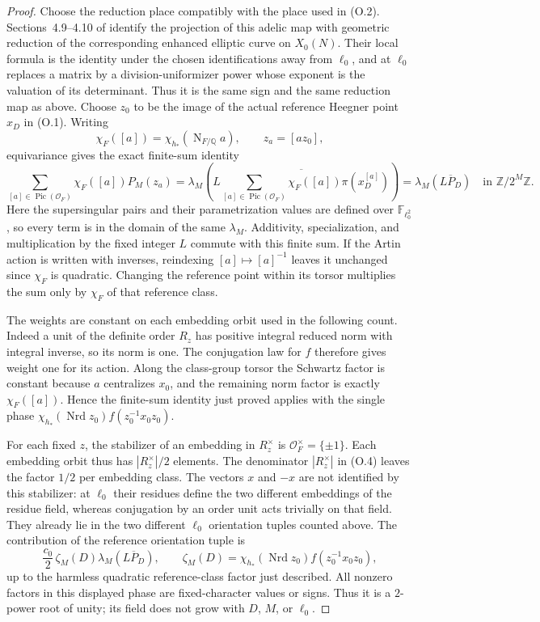 \documentclass[11pt]{article}
\theoremstyle{definition}
\theoremstyle{remark}
\newcommand{\Q}{\mathbb Q}
\newcommand{\Z}{\mathbb Z}
\begin{document}
\begin{proof}
Choose the reduction place compatibly with the place used in (O.2).
Sections~4.9--4.10 of \cite{cornutjetchev} identify the projection
of this adelic map with geometric reduction of the corresponding
enhanced elliptic curve on $X_0(N)$. Their local formula is the
identity under the chosen identifications away from $\ell_0$, and
at $\ell_0$ replaces a matrix by a division-uniformizer power
whose exponent is the valuation of its determinant. Thus it is
the same sign and the same reduction map as above. Choose $z_0$
to be the image of the actual reference Heegner point $x_D$ in
(O.1). Writing
\[
 \chi_F([a])=\chi_{h_*}(\operatorname{N}_{F/\Q}a),\qquad
 z_a=[az_0],
\]
equivariance gives the exact finite-sum identity
\[
 \sum_{[a]\in\operatorname{Pic}(\mathcal O_F)}
       \chi_F([a])P_M(z_a)
 =\lambda_M\!\left(
       \overline{L\sum_{[a]\in\operatorname{Pic}(\mathcal O_F)}
                         \chi_F([a])\pi(x_D^{[a]})}\right)
 =\lambda_M(\overline{LP_D})\quad\text{in }\Z/2^M\Z.
\]
Here the supersingular pairs and their parametrization values are
defined over $\mathbb F_{\ell_0^2}$, so every term is in the domain
of the same $\lambda_M$. Additivity, specialization, and multiplication
by the fixed integer $L$ commute with this finite sum. If the Artin
action is written with inverses, reindexing $[a]\mapsto[a]^{-1}$
leaves it unchanged since $\chi_F$ is quadratic. Changing the
reference point within its torsor multiplies the sum only by
$\chi_F$ of that reference class.

The weights are constant on each embedding orbit used in the
following count. Indeed a unit of the definite order $R_z$ has
positive integral reduced norm with integral inverse, so its norm
is one. The conjugation law for $f$ therefore gives weight one
for its action. Along the class-group torsor the Schwartz factor
is constant because $a$ centralizes $x_0$, and the remaining
norm factor is exactly $\chi_F([a])$. Hence the finite-sum identity
just proved applies with the single phase
$\chi_{h_*}(\operatorname{Nrd}z_0)f(z_0^{-1}x_0z_0)$.


For each fixed $z$, the stabilizer of an embedding in $R_z^\times$
is $\mathcal O_F^\times=\{\pm1\}$. Each embedding orbit thus
has $|R_z^\times|/2$ elements. The denominator $|R_z^\times|$
in (O.4) leaves the factor $1/2$ per embedding class. The
vectors $x$ and $-x$ are not identified by this stabilizer:
at $\ell_0$ their residues define the two different embeddings
of the residue field, whereas conjugation by an order unit acts
trivially on that field. They already lie in the two different
$\ell_0$ orientation tuples counted above. The
contribution of the reference orientation tuple is
\[
 \frac{c_0}{2}\,\zeta_M(D)
                         \lambda_M(\overline{LP_D}),\qquad
 \zeta_M(D)=\chi_{h_*}(\operatorname{Nrd}z_0)
                               f(z_0^{-1}x_0z_0),
\]
up to the harmless quadratic reference-class factor just described.
All nonzero factors in this displayed phase are fixed-character
values or signs. Thus it is a $2$-power root of unity; its field
does not grow with $D$, $M$, or $\ell_0$.


\end{proof}
\end{document}
